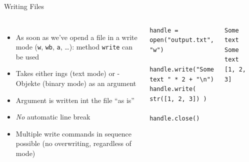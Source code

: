 \begin{frame}[fragile]{Writing Files}
%
\begin{columns}[T]
\begin{itemize}
\item As soon as we've opend a file in a write mode (\texttt{w}, \texttt{wb}, \texttt{a}, \ldots): method \texttt{write} can be used
\item Takes either ings (text mode) or -Objekte (binary mode) as an argument
\item Argument is written int the file \enquote{as is}
\item \emph{No} automatic line break
\item Multiple write commands in sequence possible (no overwriting, regardless of mode)
\end{itemize}
%
\begin{codebox}
\begin{verbatim}
handle = open("output.txt", "w")

handle.write("Some text " * 2 + "\n")
handle.write( str([1, 2, 3]) )

handle.close()
\end{verbatim}
\end{codebox}
%
\begin{cmdbox}
\begin{verbatim}
Some text Some text
[1, 2, 3]
\end{verbatim}
\end{cmdbox}
\end{columns}
%
\end{frame}



